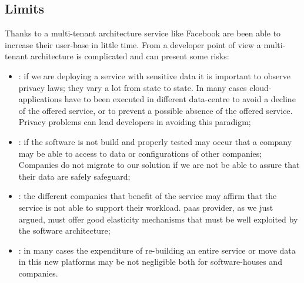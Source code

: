 \subsection{Limits}
\label{sec:elasticity-multiTenancy-limits}
Thanks to a multi-tenant architecture service like Facebook are been able to increase their user-base
in little time. From a developer point of view a multi-tenant architecture is complicated and can present
some risks:

\begin{itemize}
	\item{: if we are deploying a service with sensitive data it is important to
		observe privacy laws; they vary a lot from state to state. In many cases cloud-applications have to
		been executed in different data-centre to avoid a decline of the offered service, or to prevent a
		possible absence of the offered service. Privacy problems can lead developers in avoiding this paradigm;}
	\item{: if the software is not build and properly tested may occur that a
		company may be able to access to data or configurations of other companies; Companies do not migrate to
		our solution if we are not be able to assure that their data are safely safeguard;}
	\item{: the different companies that benefit of the service may affirm that
		the service is not able to support their workload. \ac{paas} provider, as we just argued, must offer
		good elasticity mechanisms that must be well exploited by the software architecture;}
	\item{: in many cases the expenditure of re-building
		an entire service or move data in this new platforms may be not negligible both for software-houses and
		companies.}
\end{itemize}